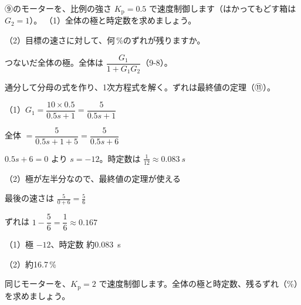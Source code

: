 \begin{reidai}[モーターの比例制御]
⑨のモーターを、比例の強さ $K_{\mathrm p}=0.5$ で速度制御します（はかってもどす箱は $G_2=1$）。
（1）全体の極と時定数を求めましょう。\par
（2）目標の速さに対して、何\,\%のずれが残りますか。\par
\kangaekata {}\par
{}\enspace つないだ全体の極。全体は $\dfrac{G_1}{1+G_1G_2}$（9-8）。\par
{}\enspace 通分して分母の式を作り、1次方程式を解く。ずれは最終値の定理（⑪）。\par
\shiki\kixjs{}\zw{} （1）$G_1=\dfrac{10\times0.5}{0.5s+1}=\dfrac{5}{0.5s+1}$\par
\kixjb 全体 $=\dfrac{5}{0.5s+1+5}=\dfrac{5}{0.5s+6}$\par
\kixjb $0.5s+6=0$ より $s=-12$。時定数は $\frac{1}{12}\approx\qty{0.083}{s}$\par
\kixja （2）極が左半分なので、最終値の定理が使える\par
\kixjb 最後の速さは $\tfrac{5}{0+6}=\tfrac56$\par
\kixjb ずれは $1-\dfrac56=\dfrac16\approx0.167$\par
\kotae\kixjs{}\zw{} （1）極 $-12$、時定数 約\qty{0.083}{s}\par
\kixja （2）約16.7\,\%
\end{reidai}

\begin{jibun}
同じモーターを、$K_{\mathrm p}=2$ で速度制御します。全体の極と時定数、残るずれ（\%）を求めましょう。
\end{jibun}

